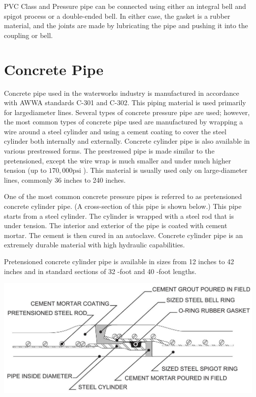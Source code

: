 \documentclass[10pt]{article}
\begin{document}
PVC Class and Pressure pipe can be connected using either an integral bell and spigot process or a double-ended bell. In either case, the gasket is a rubber material, and the joints are made by lubricating the pipe and pushing it into the coupling or bell.

\section{Concrete Pipe}
Concrete pipe used in the waterworks industry is manufactured in accordance with AWWA standards C-301 and C-302. This piping material is used primarily for largediameter lines. Several types of concrete pressure pipe are used; however, the most common types of concrete pipe used are manufactured by wrapping a wire around a steel cylinder and using a cement coating to cover the steel cylinder both internally and externally. Concrete cylinder pipe is also available in various prestressed forms. The prestressed pipe is made similar to the pretensioned, except the wire wrap is much smaller and under much higher tension (up to $170,000 \mathrm{psi}$ ). This material is usually used only on large-diameter lines, commonly 36 inches to 240 inches.

One of the most common concrete pressure pipes is referred to as pretensioned concrete cylinder pipe. (A cross-section of this pipe is shown below.) This pipe starts from a steel cylinder. The cylinder is wrapped with a steel rod that is under tension. The interior and exterior of the pipe is coated with cement mortar. The cement is then cured in an autoclave. Concrete cylinder pipe is an extremely durable material with high hydraulic capabilities.

Pretensioned concrete cylinder pipe is available in sizes from 12 inches to 42 inches and in standard sections of 32 -foot and 40 -foot lengths.

\includegraphics[max width=\textwidth]{PretensionedConcretePipe}
\end{document}
